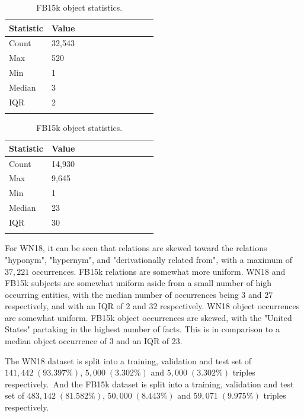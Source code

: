 \begin{table}[H]
	\parbox{.5\linewidth}{
		\centering
		\begin{tabular}{lllllllllll}
  			\textbf{Statistic} & \textbf{Value}  \\
  			\hline
			Count & 32,543 \\
			Max & 520 \\
			Min & 1 \\
  			Median & 3 \\
  			IQR & 2 \\
			&
		\end{tabular}
		\caption{WN18 object statistics.}
		}
	\hfill
	\parbox{.5\linewidth}{
		\centering
		\begin{tabular}{lllllllllll}
  			\textbf{Statistic} & \textbf{Value}  \\
  			\hline
			Count & 14,930 \\
			Max & 9,645 \\
			Min & 1 \\
  			Median & 23 \\
  			IQR & 30 \\
			&
		\end{tabular}
		\caption{FB15k object statistics.}
		}
\end{table}

\noindent For WN18, it can be seen that relations are skewed toward the relations "hyponym",  "hypernym", and "derivationally related from", with a maximum of $ 37, 221 $ occurrences. FB15k relations are somewhat more uniform. WN18 and FB15k subjects are somewhat uniform aside from a small number of high occurring entities, with the median number of occurrences being $ 3 $ and $ 27 $ respectively, and with an IQR of $ 2 $ and $ 32 $ respectively. WN18 object occurrences are somewhat uniform. FB15k object occurrences are skewed, with the "United States" partaking in the highest number of facts. This is in comparison to a median object occurrence of $ 3 $ and an IQR of 23.

\noindent The WN18 dataset is split into a training, validation and test set of $ 141, 442 \; (93.397 \%) $, $ 5, 000 \; (3.302 \%) $ and $ 5, 000 \; (3.302 \%) $ triples respectively.\ And the FB15k dataset is split into a training, validation and test set of $ 483, 142 \; (81.582 \%) $, $ 50, 000 \; (8.443 \%) $ and $ 59, 071 \; (9.975 \%) $ triples respectively. 



